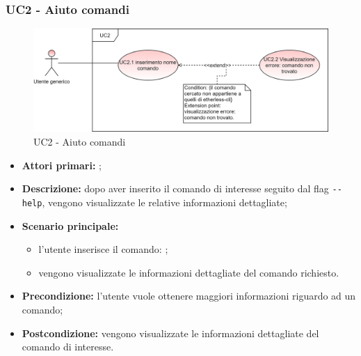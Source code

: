 \subsubsection{UC2 - Aiuto comandi}
	\begin{figure}[h]
		\centering
		\includegraphics[scale=\ucs]{./res/img/UC2.png}
		\caption {UC2 - Aiuto comandi}
	\end{figure}
	\begin{itemize}
		\item \textbf{Attori primari:} \ug{};
		\item \textbf{Descrizione:} dopo aver inserito il comando di interesse seguito dal flag \texttt{-{}-help}, vengono visualizzate le relative informazioni dettagliate;  
		\item \textbf{Scenario principale:} 
		\begin{itemize}
			\item l’utente inserisce il comando: \phelp{};
			\item vengono visualizzate le informazioni dettagliate del comando richiesto. 
		\end{itemize}
		\item \textbf{Precondizione:} l’utente vuole ottenere maggiori informazioni riguardo ad un comando;
		\item \textbf{Postcondizione:} vengono visualizzate le informazioni dettagliate del comando di interesse.  
	\end{itemize}